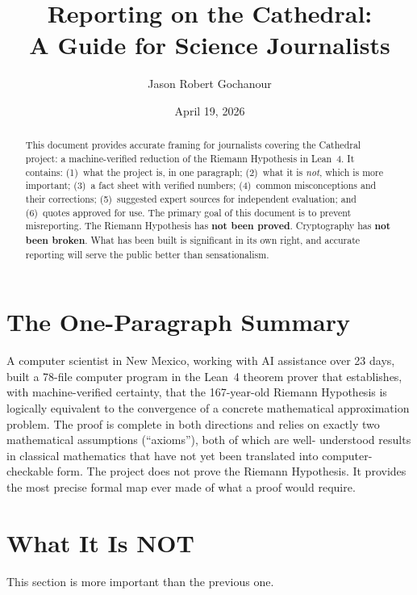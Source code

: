 \documentclass[11pt,a4paper]{article}
\title{%
  Reporting on the Cathedral:\\
  A Guide for Science Journalists%
}
\author{
  Jason Robert Gochanour
}
\date{April 19, 2026}
\begin{document}
\maketitle

\begin{abstract}
This document provides accurate framing for journalists covering
the Cathedral project: a machine-verified reduction of the
Riemann Hypothesis in Lean~4. It contains: (1)~what the project
is, in one paragraph; (2)~what it is \emph{not}, which is more
important; (3)~a fact sheet with verified numbers; (4)~common
misconceptions and their corrections; (5)~suggested expert sources
for independent evaluation; and (6)~quotes approved for use.
The primary goal of this document is to prevent misreporting.
The Riemann Hypothesis has \textbf{not been proved}. Cryptography
has \textbf{not been broken}. What has been built is significant
in its own right, and accurate reporting will serve the public
better than sensationalism.
\end{abstract}

\section{The One-Paragraph Summary}

A computer scientist in New Mexico, working with AI assistance over
23 days, built a 78-file computer program in the Lean~4 theorem
prover that establishes, with machine-verified certainty, that the
167-year-old Riemann Hypothesis is logically equivalent to the
convergence of a concrete mathematical approximation problem. The
proof is complete in both directions and relies on exactly two
mathematical assumptions (``axioms''), both of which are well-
understood results in classical mathematics that have not yet been
translated into computer-checkable form. The project does not prove
the Riemann Hypothesis. It provides the most precise formal map ever
made of what a proof would require.

\section{What It Is NOT}
\label{sec:not}

This section is more important than the previous one.
\end{document}
